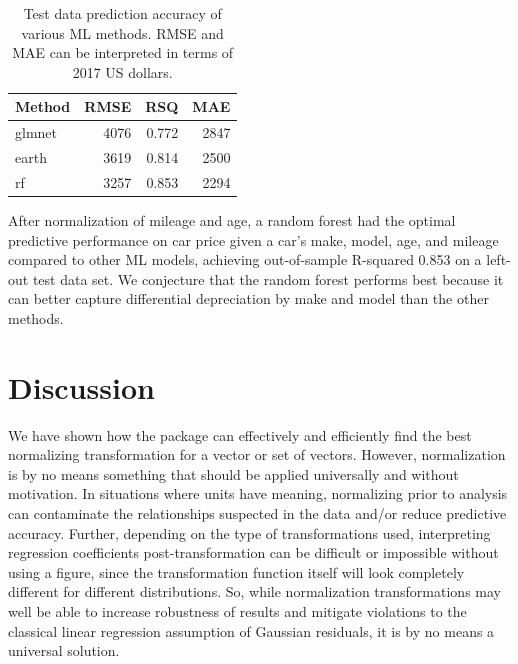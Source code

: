 \begin{Schunk}
\end{Schunk}

\begin{Schunk}
\begin{table}

\caption{\label{tab:unnamed-chunk-16}Test data prediction accuracy of various ML methods. RMSE and MAE can be interpreted in terms of 2017 US dollars.}
\centering
\begin{tabular}[t]{lrrr}
\toprule
Method & RMSE & RSQ & MAE\\
\midrule
glmnet & 4076 & 0.772 & 2847\\
earth & 3619 & 0.814 & 2500\\
rf & 3257 & 0.853 & 2294\\
\bottomrule
\end{tabular}
\end{table}

\end{Schunk}

After normalization of mileage and age, a random forest had the optimal
predictive performance on car price given a car's make, model, age, and
mileage compared to other ML models, achieving out-of-sample R-squared
0.853 on a left-out test data set. We conjecture that the random forest
performs best because it can better capture differential depreciation by
make and model than the other methods.

\hypertarget{discussion}{%
\section{Discussion}\label{discussion}}

We have shown how the  package can effectively and
efficiently find the best normalizing transformation for a vector or set
of vectors. However, normalization is by no means something that should
be applied universally and without motivation. In situations where units
have meaning, normalizing prior to analysis can contaminate the
relationships suspected in the data and/or reduce predictive accuracy.
Further, depending on the type of transformations used, interpreting
regression coefficients post-transformation can be difficult or
impossible without using a figure, since the transformation function
itself will look completely different for different distributions. So,
while normalization transformations may well be able to increase
robustness of results and mitigate violations to the classical linear
regression assumption of Gaussian residuals, it is by no means a
universal solution.

